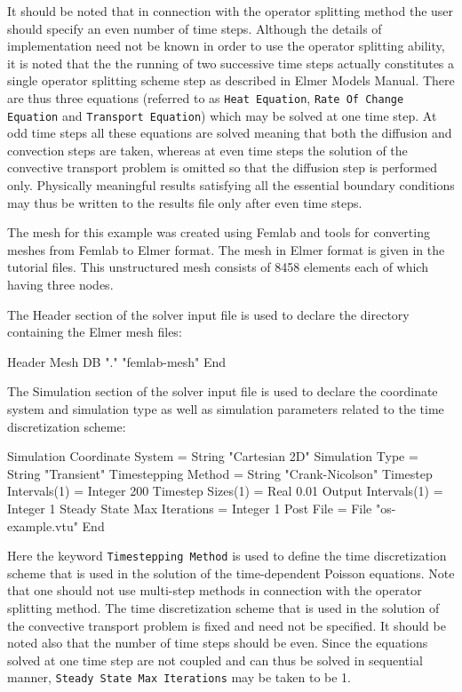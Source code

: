 It should be noted that in connection with the operator splitting method
the user should specify an even number of time steps.
Although the details of implementation need not be known in order to use
the operator splitting ability, it is noted that the the running of two 
successive time steps actually constitutes a single operator splitting scheme
step as described in Elmer Models Manual. 
There are thus three equations (referred to as {\tt Heat Equation},
{\tt Rate Of Change Equation} and {\tt Transport Equation}) which may be 
solved at one time step. 
At odd time steps all these equations are solved meaning that
both the diffusion and convection steps are taken, whereas at even time
steps the solution of the convective transport problem is omitted so that
the diffusion step is performed only. Physically meaningful results
satisfying all the essential boundary conditions may thus be written to
the results file only after even time steps.
 
The mesh for this example was created using Femlab and tools for 
converting meshes from Femlab to Elmer format. The mesh in Elmer format is 
given in the tutorial files. This unstructured mesh
consists of 8458 elements each of which having three nodes.    

The Header section of the solver input file is used to declare the directory
containing the Elmer mesh files:

\ttbegin
Header
  Mesh DB "." "femlab-mesh"
End
\ttend

The Simulation section of the solver input file is used to declare the 
coordinate system and simulation type as well as simulation parameters 
related to the time discretization scheme: 

\ttbegin
Simulation
  Coordinate System = String "Cartesian 2D"
  Simulation Type = String "Transient"
  Timestepping Method = String "Crank-Nicolson"
  Timestep Intervals(1) = Integer 200
  Timestep Sizes(1) = Real 0.01
  Output Intervals(1) = Integer 1
  Steady State Max Iterations = Integer 1
  Post File = File "os-example.vtu"
End
\ttend

Here the keyword {\tt Timestepping Method} is used to 
define the time discretization scheme that is used in the solution of the 
time-dependent Poisson equations. Note that one should not use 
multi-step methods in connection with the operator splitting method. 
The time discretization scheme that is used
in the solution of the convective transport problem is fixed and need not
be specified. It should be noted also that
the number of time steps should be even. Since the equations
solved at one time step are not coupled and can thus be solved in sequential 
manner, {\tt Steady State Max Iterations} may be taken to be 1.     


